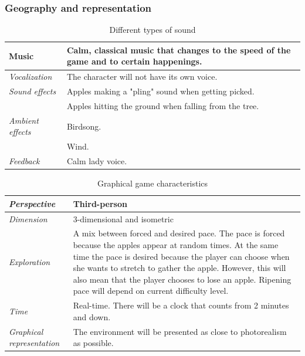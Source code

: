 \subsubsection{Geography and representation}

\begin{table} [H]
\centering
    \begin{tabular}{|p{}|p{}|}
       \hline
       {Music} & Calm, classical music that changes to the speed of the game and to certain happenings. \\ \hline
       \emph{Vocalization} & The character will not have its own voice. \\ \hline
       \emph{Sound effects} & Apples making a "pling" sound when getting picked.  \\ \cline{2-2}
	    &  Apples hitting the ground when falling from the tree. \\ \hline
	       \emph{Ambient effects} & Birdsong. \\ \cline{2-2}
	         & Wind. \\ \hline
	         \emph{Feedback} & Calm lady voice. \\ \hline
    \end{tabular}
    \caption[Different types of sounds in the "Apple Picking" game]{Different types of sound}
    \label{tab:sound2}
\end{table}  

\begin{table} [H]
\centering
    \begin{tabular}{|p{}|p{}|}
       \hline
      \emph {Perspective} & Third-person \\ \hline
       \emph{Dimension} &  3-dimensional and isometric \\ \hline
	       \emph{Exploration} &  A mix between forced and desired pace. The pace is forced because the apples appear at random times. At the same time the pace is desired because the player can choose when she wants to stretch to gather the apple. However, this will also mean that the player chooses to lose an apple. Ripening pace will depend on current difficulty level.\\ \hline
	       \emph{Time} & Real-time. There will be a clock that counts from 2 minutes and down. \\ \hline
	       \emph{Graphical representation} & The environment will be presented as close to photorealism as possible.  \\ \hline
    \end{tabular}
    \caption[Graphical game characteristics in the "Apple Picking" game]{Graphical game characteristics}
    \label{tab:graphical2}
\end{table}  

